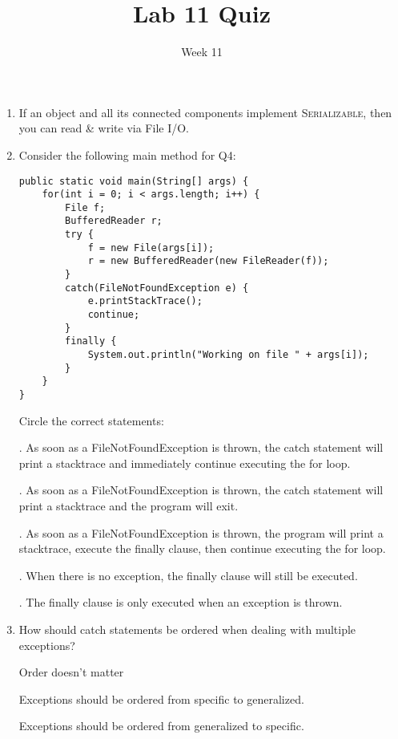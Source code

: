 \documentclass[addpoints]{exam}
\title{Lab 11 Quiz}
\date{Week 11}
\newcommand{\RN}[1]{%
  \textup{\uppercase\expandafter{\romannumeral#1}}%
}
\begin{document}
 

\Instructions

\begin{enumerate}
\vspace{2em}



\newline

\item
\question {} \tf If an object and all its connected components implement \textsc{Serializable}, then you can read \& write via File I/O.

\newline

\newline
\item
\question {}


Consider the following main method for Q4:

\begin{lstlisting}
public static void main(String[] args) {
    for(int i = 0; i < args.length; i++) {
        File f;
        BufferedReader r;
        try {
            f = new File(args[i]);
            r = new BufferedReader(new FileReader(f));
        }
        catch(FileNotFoundException e) {
		    e.printStackTrace();
            continue;
        }
        finally {
            System.out.println("Working on file " + args[i]);
        }
    }
}
\end{lstlisting}

Circle the correct statements:
\newline

\RN{1}. As soon as a FileNotFoundException is thrown, the catch statement will print a stacktrace and immediately continue executing the for loop.

\RN{2}. As soon as a FileNotFoundException is thrown, the catch statement will print a stacktrace and the program will exit.

\RN{3}. As soon as a FileNotFoundException is thrown, the program will print a stacktrace, execute the finally clause, then continue executing the for loop. 

\RN{4}. When there is no exception, the finally clause will still be executed. 

\RN{5}. The finally clause is only executed when an exception is thrown.



\item
\question {} How should catch statements be ordered when dealing with multiple exceptions? 
\newline
\begin{choices} 

 \choice Order doesn't matter 
 
 \choice Exceptions should be ordered from specific to generalized. 
 
 \choice Exceptions should be ordered from generalized to specific. 
 

\end{choices}

\newline
\newline

\vspace{2em}
\end{enumerate}
\end{document}
